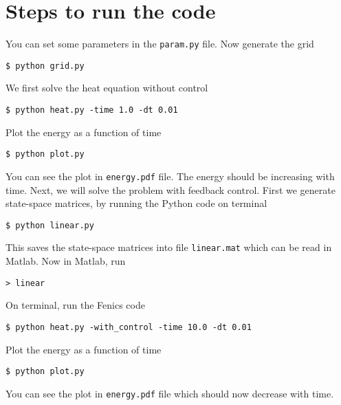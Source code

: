 \documentclass[11pt, oneside]{article}   	%
\begin{document}
\section{Steps to run the code}

You can set some parameters in the \texttt{param.py} file. Now generate the grid
\begin{lstlisting}
$ python grid.py
\end{lstlisting}
We first solve the heat equation without control
\begin{lstlisting}
$ python heat.py -time 1.0 -dt 0.01
\end{lstlisting}
Plot the energy as a function of time
\begin{lstlisting}
$ python plot.py
\end{lstlisting}
You can see the plot in \texttt{energy.pdf} file. The energy should be increasing with time. Next, we will solve the problem with feedback control. First we generate state-space matrices, by running the Python code on terminal
\begin{lstlisting}
$ python linear.py
\end{lstlisting}
This saves the state-space matrices into file \texttt{linear.mat} which can be read in Matlab. Now in Matlab, run
\begin{lstlisting}
> linear
\end{lstlisting}
On terminal, run the Fenics code
\begin{lstlisting}
$ python heat.py -with_control -time 10.0 -dt 0.01
\end{lstlisting}
Plot the energy as a function of time
\begin{lstlisting}
$ python plot.py
\end{lstlisting}
You can see the plot in \texttt{energy.pdf} file which should now decrease with time.
\end{document}
